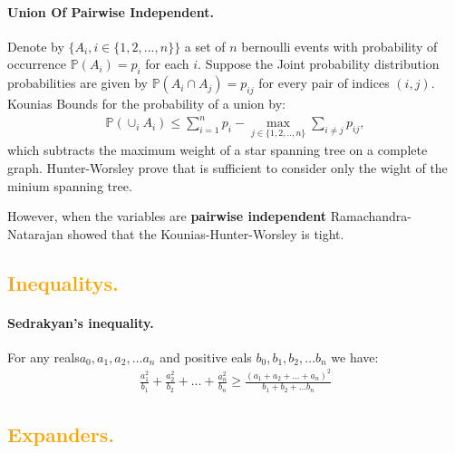 \documentclass{article}
\begin{document}
\begin{multicols*}{2}
  \paragraph{Union Of Pairwise Independent.}  Denote by $\{{A}_i, i \in \{1,2,...,n\}\}$ a set of  $n$ bernoulli events with probability of occurrence $\mathbb{P}(A_{i})=p_i$  for each $i$. Suppose the Joint probability distribution probabilities are given by $\mathbb{P}(A_{i} \cap A_{j})=p_{ij}$ for every pair of indices $(i,j)$. Kounias Bounds for the probability of a union by:
  \begin{equation*}
    \begin{split}
        \mathbb{P}(\displaystyle {\cup}_iA_{i}) \le  \sum_{i=1}^n p_{i}-\underset {j\in \{1,2,..,n\}}{\max} \sum_{i\neq j} p_{ij}, 
    \end{split}
  \end{equation*}
  which subtracts the maximum weight of a star spanning tree on a complete graph. Hunter-Worsley prove that is sufficient to consider only the wight of the minium spanning tree.

  However, when the variables are \textbf{pairwise independent} Ramachandra-Natarajan showed that the Kounias-Hunter-Worsley is tight.


  \subsection*{{\textcolor{orange}{Inequalitys.}} } 
  \paragraph{Sedrakyan's inequality.} For any reals$a_{0},a_{1},a_{2},\ldots a_{n}$ and positive eals $b_{0},b_{1},b_{2},\ldots b_{n}$ we have:  
  \begin{equation*}
    \begin{split}
      \frac{a_{1}^2}{b_{1}}+\frac{a_{2}^2}{b_{2}}+ ...+ \frac{a_{n}^2}{b_{n}} \ge \frac{\left( a_{1}+ a_{2} + ... + a_{n}  \right)^{2}}{b_{1}+b_{2}+... b_{n}}  
    \end{split}
  \end{equation*}
  \subsection*{{\textcolor{orange}{Expanders.}} } 

\end{multicols*}
\end{document}
